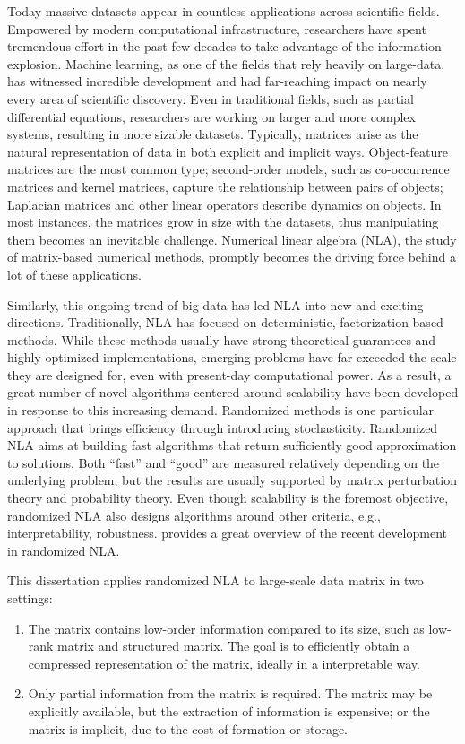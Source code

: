 Today massive datasets appear in countless applications across scientific
fields. Empowered by modern computational infrastructure, researchers have spent
tremendous effort in the past few decades to take advantage of the information
explosion. Machine learning, as one of the fields that rely heavily on 
large\hyp{}data, has witnessed incredible development and had far\hyp{}reaching
impact on nearly every area of scientific discovery. Even in traditional fields,
such as partial differential equations, researchers are working on larger and
more complex systems, resulting in more sizable datasets. Typically, matrices
arise as the natural representation of data in both explicit and implicit ways.
Object\hyp{}feature matrices are the most common type; second\hyp{}order models,
such as co-occurrence matrices and kernel matrices, capture the relationship
between pairs of objects; Laplacian matrices and other linear operators describe
dynamics on objects. In most instances, the matrices grow in size with the
datasets, thus manipulating them becomes an inevitable challenge. Numerical
linear algebra (NLA), the study of matrix\hyp{}based numerical methods,
promptly becomes the driving force behind a lot of these applications.

Similarly, this ongoing trend of big data has led NLA into new and exciting
directions. Traditionally, NLA has focused on deterministic, 
factorization\hyp{}based methods. While these methods usually have strong
theoretical guarantees and highly optimized implementations, emerging problems
have far exceeded the scale they are designed for, even with present\hyp{}day
computational power. As a result, a great number of novel algorithms centered
around scalability have been developed in response to this increasing demand.
Randomized methods is one particular approach that brings efficiency through
introducing stochasticity. Randomized NLA aims at building fast algorithms that
return sufficiently good approximation to solutions. Both ``fast'' and ``good''
are measured relatively depending on the underlying problem, but the results are
usually supported by matrix perturbation theory and probability theory. Even
though scalability is the foremost objective, randomized NLA also designs
algorithms around other criteria, e.g., interpretability, robustness. 
\citet{drineas2016randnla} provides a great overview of the recent development
in randomized NLA.

This dissertation applies randomized NLA to large-scale data matrix in two
settings:
\begin{enumerate}
	\item The matrix contains low\hyp{}order information compared to its size,
	such as low\hyp{}rank matrix and structured matrix. The goal is to
	efficiently obtain a compressed representation of the matrix, ideally in a
	interpretable way.
	\item Only partial information from the matrix is required. The matrix
	may be explicitly available, but the extraction of information is expensive;
	or the matrix is implicit, due to the cost of formation or storage.
\end{enumerate}

